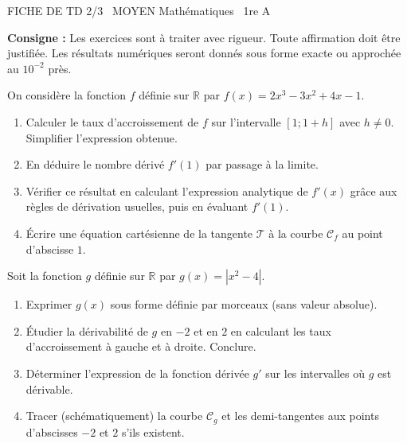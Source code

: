 \documentclass[11pt]{article}
\begin{document}
\begin{tcolorbox}[enhanced,colback=popink,colframe=popink,arc=10pt,boxrule=0pt,left=12pt,right=12pt,top=9pt,bottom=9pt]
{\color{white}\popxbold\small FICHE DE TD 2/3 \textbullet\ MOYEN \hfill Mathématiques \textbullet\ 1re A\par}
\end{tcolorbox}
\vspace{4pt}
\noindent\textbf{Consigne :} Les exercices sont à traiter avec rigueur. Toute affirmation doit être justifiée. Les résultats numériques seront donnés sous forme exacte ou approchée au $10^{-2}$ près.

\begin{exercice}
On considère la fonction $f$ définie sur $\mathbb{R}$ par $f(x) = 2x^3 - 3x^2 + 4x - 1$.
\begin{enumerate}
    \item Calculer le taux d'accroissement de $f$ sur l'intervalle $[1 ; 1+h]$ avec $h \neq 0$. Simplifier l'expression obtenue.
    \item En déduire le nombre dérivé $f'(1)$ par passage à la limite.
    \item Vérifier ce résultat en calculant l'expression analytique de $f'(x)$ grâce aux règles de dérivation usuelles, puis en évaluant $f'(1)$.
    \item Écrire une équation cartésienne de la tangente $\mathcal{T}$ à la courbe $\mathcal{C}_f$ au point d'abscisse $1$.
\end{enumerate}
\end{exercice}

\begin{exercice}
Soit la fonction $g$ définie sur $\mathbb{R}$ par $g(x) = |x^2 - 4|$.
\begin{enumerate}
    \item Exprimer $g(x)$ sous forme définie par morceaux (sans valeur absolue).
    \item Étudier la dérivabilité de $g$ en $-2$ et en $2$ en calculant les taux d'accroissement à gauche et à droite. Conclure.
    \item Déterminer l'expression de la fonction dérivée $g'$ sur les intervalles où $g$ est dérivable.
    \item Tracer (schématiquement) la courbe $\mathcal{C}_g$ et les demi-tangentes aux points d'abscisses $-2$ et $2$ s'ils existent.
\end{enumerate}
\end{exercice}
\end{document}
